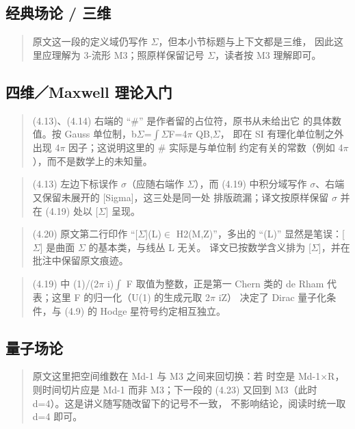 \subsection*{经典场论 / 三维}
\begin{quote}\small
原文这一段的定义域仍写作 $\Sigma$，但本小节标题与上下文都是三维， 因此这里应理解为 3-流形 M3；照原样保留记号 $\Sigma$，读者按 M3 理解即可。
\end{quote}

\subsection*{四维／Maxwell 理论入门}
\begin{quote}\small
(4.13)、(4.14) 右端的 “\#” 是作者留的占位符，原书从未给出它 的具体数值。按 Gauss 单位制，b$\Sigma$=$\int$$\Sigma$F=4$\pi$ QB,$\Sigma$， 即在 SI 有理化单位制之外出现 4$\pi$ 因子；这说明这里的 \# 实际是与单位制 约定有关的常数（例如 4$\pi$），而不是数学上的未知量。
\end{quote}

\begin{quote}\small
(4.13) 左边下标误作 $\sigma$（应随右端作 $\Sigma$），而 (4.19) 中积分域写作 $\sigma$、右端又保留未展开的 [Sigma]，这三处是同一处 排版疏漏；译文按原样保留 $\sigma$ 并在 (4.19) 处以 [$\Sigma$] 呈现。
\end{quote}

\begin{quote}\small
(4.20) 原文第二行印作 “[$\Sigma$](L)$\in$ H2(M,Z)”，多出的 “(L)” 显然是笔误：[$\Sigma$] 是曲面 $\Sigma$ 的基本类，与线丛 L 无关。 译文已按数学含义排为 [$\Sigma$]，并在批注中保留原文痕迹。
\end{quote}

\begin{quote}\small
(4.19) 中 (1)/(2$\pi$ i)$\int$ F 取值为整数，正是第一 Chern 类的 de Rham 代表；这里 F 的归一化（U(1) 的生成元取 2$\pi$ iZ） 决定了 Dirac 量子化条件，与 (4.9) 的 Hodge 星符号约定相互独立。
\end{quote}

\subsection*{量子场论}
\begin{quote}\small
原文这里把空间维数在 Md-1 与 M3 之间来回切换：若 时空是 Md-1$\times$R，则时间切片应是 Md-1 而非 M3；下一段的 (4.23) 又回到 M3（此时 d=4）。这是讲义随写随改留下的记号不一致， 不影响结论，阅读时统一取 d=4 即可。
\end{quote}

